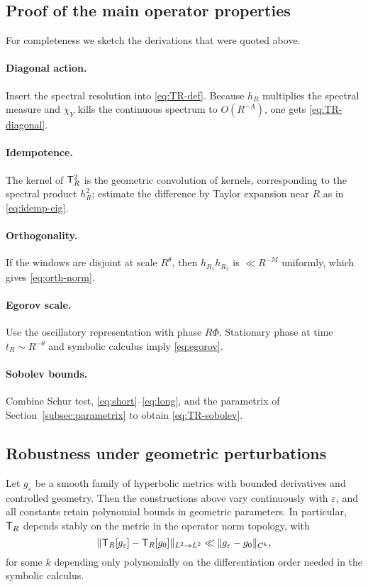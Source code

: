 \subsection{Proof of the main operator properties}\label{subsec:proj-proofs}
For completeness we sketch the derivations that were quoted above.
\paragraph{Diagonal action.}
Insert the spectral resolution into \eqref{eq:TR-def}.
Because $h_R$ multiplies the spectral measure and $\chi_Y$ kills the continuous spectrum to $O(R^{-A})$, one gets \eqref{eq:TR-diagonal}.
\paragraph{Idempotence.}
The kernel of $\mathsf{T}_R^2$ is the geometric convolution of kernels, corresponding to the spectral product $h_R^2$; estimate the difference by Taylor expansion near $R$ as in \eqref{eq:idemp-eig}.
\paragraph{Orthogonality.}
If the windows are disjoint at scale $R^\theta$, then $h_{R_1}h_{R_2}$ is $\ll R^{-M}$ uniformly, which gives \eqref{eq:orth-norm}.
\paragraph{Egorov scale.}
Use the oscillatory representation with phase $R\Phi$.
Stationary phase at time $t_R\sim R^{-\theta}$ and symbolic calculus imply \eqref{eq:egorov}.
\paragraph{Sobolev bounds.}
Combine Schur test, \eqref{eq:short}–\eqref{eq:long}, and the parametrix of Section~\ref{subsec:parametrix} to obtain \eqref{eq:TR-sobolev}.

\subsection{Robustness under geometric perturbations}\label{subsec:proj-stability}
Let $g_\varepsilon$ be a smooth family of hyperbolic metrics with bounded derivatives and controlled geometry.
Then the constructions above vary continuously with $\varepsilon$, and all constants retain polynomial bounds in geometric parameters.
In particular, $\mathsf{T}_R$ depends stably on the metric in the operator norm topology, with
\[
\|\mathsf{T}_R[g_\varepsilon]-\mathsf{T}_R[g_0]\|_{L^2\to L^2}\ll \|g_\varepsilon-g_0\|_{C^k},
\]
for some $k$ depending only polynomially on the differentiation order needed in the symbolic calculus.

